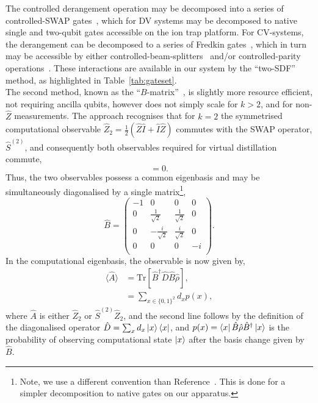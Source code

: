The controlled derangement operation may be decomposed into a series of
controlled-SWAP gates~\cite{koczor_exponential_2021}, which for DV systems may
be decomposed to native single and two-qubit gates accessible on the ion trap
platform. For CV-systems, the derangement can be decomposed to a series of
Fredkin gates~\cite{fredkin_conservative_1982, gao_entanglement_2019}, which in
turn may be accessible by either
controlled-beam-splitters~\cite{gan_hybrid_2020,jeon_two-mode_2025} and/or
controlled-parity operations~\cite{choi_multimode_2026}. These interactions are available in our system by the ``two-SDF'' method, as highlighted in Table~\ref{tab:gateset}.\\

The second method, known as the ``$B$-matrix''~\cite{huggins_virtual_2021}, is slightly more resource efficient, not requiring ancilla qubits, however does not simply scale for $k>2$, and for non-$\hat Z$ measurements. The approach recognises that for $k=2$ the symmetrised computational observable $\hat Z_2 = \frac{1}{2}(\hat Z\hat I + \hat I\hat Z)$ commutes with the SWAP operator, $\hat S^{(2)}$, and consequently both observables required for virtual distillation commute,
\begin{equation}
    [\hat S^{(2)}, \hat Z_2 \hat S^{(2)}] = 0.
\end{equation}
Thus, the two observables possess a common eigenbasis and may be simultaneously diagonalised by a single matrix\footnote{Note, we use a different convention than Reference~\cite{huggins_virtual_2021}. This is done for a simpler decomposition to native gates on our apparatus.}, 
\begin{equation}
    \label{eqn:bmatrix}
        \hat B =
    \begin{pmatrix}
        -1&0&0&0\\
        0&\frac{1}{\sqrt{2}}&\frac{1}{\sqrt{2}}&0\\
        0&-\frac{i}{\sqrt{2}}&\frac{i}{\sqrt{2}}&0\\
        0&0&0&-i\\
    \end{pmatrix}.
\end{equation}
In the computational eigenbasis, the observable is now given by,
\begin{subequations}
\begin{align}
    \langle \hat A \rangle &= \mathrm{Tr}[\hat B^\dagger\hat D\hat B\hat\rho],\\
    &= \sum_{x\in\{0,1\}^2}d_x p(x),
\end{align}
\end{subequations}
where $\hat A$ is either $\hat Z_2$ or $\hat S^{(2)}\hat Z_2$, and the second line follows by the definition of the diagonalised operator $\hat D=\sum_xd_x\ket{x}\bra{x}$, and $p(x)=\bra{x}\hat B\hat\rho \hat B^\dagger\ket{x}$ is the probability of observing computational state $\ket{x}$ after the basis change given by $\hat B$.

